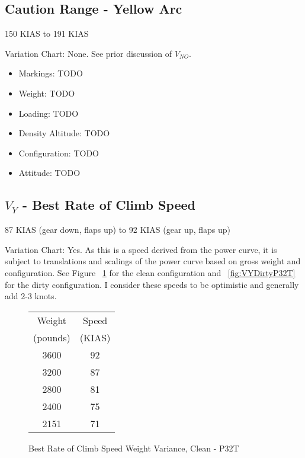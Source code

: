 \subsection{Caution Range - Yellow Arc}

150 KIAS to 191 KIAS

Variation Chart: None. See prior discussion of $V_{NO}$.

\begin{itemize}
\item Markings: TODO
\item Weight: TODO
\item Loading: TODO
\item Density Altitude: TODO
\item Configuration: TODO
\item Attitude: TODO
\end{itemize}

\subsection{$V_Y$ - Best Rate of Climb Speed}

87 KIAS (gear down, flaps up) to 92 KIAS (gear up, flaps up)

Variation Chart: Yes. As this is a speed derived from the power curve, it is subject to translations and scalings of the power curve based on gross weight and configuration. See Figure ~\ref{fig:VYCleanP32T} for the clean configuration and ~\ref{fig:VYDirtyP32T} for the dirty configuration. I consider these speeds to be optimistic and generally add 2-3 knots.

\begin{figure}
\begin{center}
\begin{tabular}{ |c|c| }
    \hline
    Weight & Speed \\
    (pounds) & (KIAS) \\
    \hline
     3600 &  92 \\
     3200 &  87 \\
    \hline
     2800 &  81 \\
     2400 &  75 \\
    \hline
     2151 &  71 \\
    \hline
\end{tabular}
\end{center}
\caption{Best Rate of Climb Speed Weight Variance, Clean - P32T}
\label{fig:VYCleanP32T}
\end{figure}

